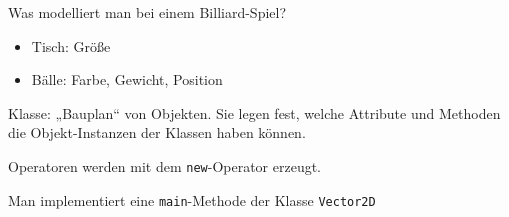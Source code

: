 Was modelliert man bei einem Billiard-Spiel?
\begin{itemize}
\item Tisch: Größe
\item Bälle: Farbe, Gewicht, Position
\end{itemize}

Klasse: „Bauplan“ von Objekten. Sie legen fest, welche Attribute und Methoden die Objekt-Instanzen der Klassen haben können.

Operatoren werden mit dem \texttt{new}-Operator erzeugt.

\begin{example}
  Man implementiert eine \texttt{main}-Methode der Klasse \texttt{Vector2D}
  
\end{example}